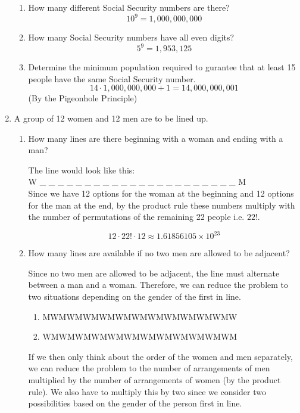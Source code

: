 \documentclass[letterpaper, 12pt]{article}
\newcommand{\0}{\emptyset}
\begin{document}
\begin{enumerate}
\begin{enumerate}
\item How many different Social Security numbers are there?
\[
    10^9 = 1,000,000,000
\]
\item How many Social Security numbers have all even digits?
\[
    5^9 = 1,953,125
\]
\item Determine the minimum population required to gurantee that at least 15 people have the 
same Social Security number. \\
\[
    14 \cdot 1,000,000,000 + 1 = 14,000,000,001
\]
(By the Pigeonhole Principle)
\end{enumerate}
\item A group of 12 women and 12 men are to be lined up.
\begin{enumerate}
\item How many lines are there beginning with a woman and ending with a man?
\begin{flushleft}
    The line would look like this: \\
    W \_ \_ \_ \_ \_ \_ \_ \_ \_ \_ \_ \_ \_ \_ \_ \_ \_ \_ \_ \_ \_ \_ M \\
    Since we have 12 options for the woman at the beginning and 12 options for the man at the end, 
    by the product rule these numbers multiply with the number of permutations of the remaining 
    22 people i.e. $22!$.
\end{flushleft}
\[
    12 \cdot 22! \cdot 12 \approx 1.61856105\times10^{23}
\]
\item How many lines are available if no two men are allowed to be adjacent?
\begin{flushleft}
    Since no two men are allowed to be adjacent, the line must alternate between a man and a 
    woman. Therefore, we can reduce the problem to two situations depending on the gender of 
    the first in line.
    \begin{enumerate}
        \item MWMWMWMWMWMWMWMWMWMWMWMW
        \item WMWMWMWMWMWMWMWMWMWMWMWM
    \end{enumerate}
    If we then only think about the order of the women and men separately, we can reduce the 
    problem to the number of arrangements of men multiplied by the number of arrangements of 
    women (by the product rule). We also have to multiply this by two since we consider two 
    possibilities based on the gender of the person first in line.
\end{flushleft}

\end{enumerate}
\end{enumerate}
\end{document}
